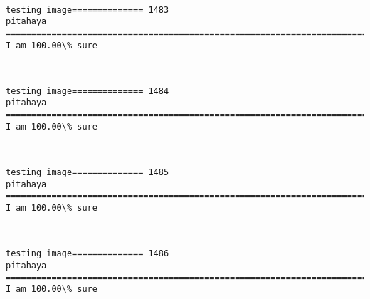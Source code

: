 \documentclass[11pt]{article}
\begin{document}
    \begin{center}
    \end{center}
    { \hspace*{\fill} \\}
    
    \begin{Verbatim}[commandchars=\\\{\}]
testing image============== 1483
pitahaya
============================================================================
I am 100.00\% sure

    \end{Verbatim}

    \begin{center}
    \end{center}
    { \hspace*{\fill} \\}
    
    \begin{Verbatim}[commandchars=\\\{\}]
testing image============== 1484
pitahaya
============================================================================
I am 100.00\% sure

    \end{Verbatim}

    \begin{center}
    \end{center}
    { \hspace*{\fill} \\}
    
    \begin{Verbatim}[commandchars=\\\{\}]
testing image============== 1485
pitahaya
============================================================================
I am 100.00\% sure

    \end{Verbatim}

    \begin{center}
    \end{center}
    { \hspace*{\fill} \\}
    
    \begin{Verbatim}[commandchars=\\\{\}]
testing image============== 1486
pitahaya
============================================================================
I am 100.00\% sure

    \end{Verbatim}
\end{document}
